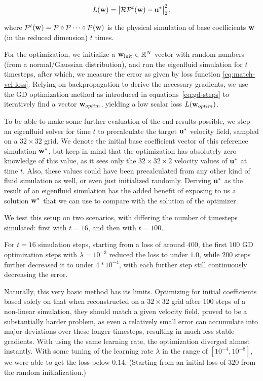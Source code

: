 \begin{equation}\label{eq:match-vel-loss}
  L(\vb{w}) = \left|
  \mathcal{R}\mathcal{P}^{t}(\vb{w}) - \vb{u}^*
  \right|_2^2,
\end{equation}

where $\mathcal{P}^t(\vb{w}) = \mathcal{P} \circ \mathcal{P} \dots \circ
\mathcal{P}(\vb{w})$ is the physical simulation of base coefficients $\vb{w}$
(in the reduced dimension) $t$ times.

For the optimization, we initialize a $\vb{w}_\text{init} \in \mathbb{R}^N$
vector with random numbers (from a normal/Gaussian distribution), and run the
eigenfluid simulation for $t$ timesteps, after which, we measure the error as
given by loss function \eqref{eq:match-vel-loss}. Relying on backpropagation to
derive the necessary gradients, we use the \ac{GD} optimization method as
introduced in equations~\eqref{eq:gd-steps} to iteratively find a vector
$\vb{w}_{optim}$, yielding a low scalar loss $L(\vb{w}_{optim})$.

To be able to make some further evaluation of the end results possible, we step
an eigenfluid solver for time $t$ to precalculate the target $\vb{u}^*$ velocity
field, sampled on a $32\times32$ grid. We denote the initial base coefficient
vector of this reference simulation $\vb{w}^*$, but keep in mind that the
optimization has absolutely zero knowledge of this value, as it sees only the
$32\times32\times2$ velocity values of $\vb{u}^*$ at time $t$. Also, these
values could have been precalculated from any other kind of fluid simulation as
well, or even just initialized randomly. Deriving $\vb{u}^*$ as the result of an
eigenfluid simulation has the added benefit of exposing to us a solution
$\vb{w}^*$ that we can use to compare with the solution of the optimizer.

We test this setup on two scenarios, with differing the number of timesteps
simulated: first with $t=16$, and then with $t=100$.

For $t=16$ simulation steps, starting from a loss of around $400$, the first
$100$ \ac{GD} optimization steps with $\lambda=10^{-3}$ reduced the loss to
under $1.0$, while $200$ steps further decreased it to under $4*10^{-4}$, with
each further step still continuously decreasing the error. 

Naturally, this very basic method has its limits.  Optimizing for initial
coefficients based solely on that when reconstructed on a $32\times32$ grid
after $100$ steps of a non-linear simulation, they should match a given velocity
field, proved to be a substantially harder problem, as even a relatively small
error can accumulate into major deviations over these longer timesteps,
resulting in much less stable gradients. With using the same learning rate, the
optimization diverged almost instantly. With some tuning of the learning rate
$\lambda$ in the range of $[10^{-4}, 10^{-8}]$, we were able to get the loss
below $0.14$.  (Starting from an initial loss of $320$ from the random
initialization.) 

